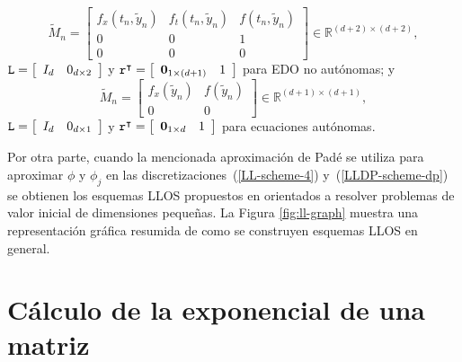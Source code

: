 \begin{equation*}
\widetilde{M}_{n}=\left[ 
\begin{array}{ccc}
f_{x}(t_{n},\widetilde{y}_{n}) &f%
_{t}(t_{n},\widetilde{y}_{n}) & f(t_{n},\widetilde{
		y}_{n}) \\ 
0 & 0 & 1 \\ 
0 & 0 & 0%
\end{array}%
\right] \in \mathbb{R}^{(d+2)\times (d+2)},
\end{equation*}%
$\lmatrix=\left[ 
\begin{array}{ll}
I_{d} & 0_{d\times 2}%
\end{array}%
\right] $ y $\rvector^{\intercal }=\left[ 
\begin{array}{ll}
\mathbf{0}_{1\times (d+1)} & 1%
\end{array}%
\right] $ para EDO no autónomas; y 
\begin{equation*}
\widetilde{M}_{n}=\left[ 
\begin{array}{cc}
f_{x}(\widetilde{y}_{n}) & f(\widetilde{y}_{n}) \\ 
0 & 0%
\end{array}%
\right] \in \mathbb{R}^{(d+1)\times (d+1)},
\end{equation*}%
$\lmatrix=\left[ 
\begin{array}{ll}
I_{d} & 0_{d\times 1}%
\end{array}%
\right] $ y $\rvector^{\intercal }=\left[ 
\begin{array}{ll}
\mathbf{0}_{1\times d} & 1%
\end{array}%
\right] $ para ecuaciones autónomas.

Por otra parte, cuando la mencionada aproximación de Padé se utiliza para aproximar $\phi$ y $\phi_j$ en las discretizaciones~(\ref{LL-scheme-4}) y~(\ref{LLDP-scheme-dp}) se obtienen los esquemas LLOS propuestos en \cite{Jimenez13,Jimenez14AMC} orientados a resolver problemas de valor inicial de dimensiones pequeñas. La Figura \ref{fig:ll-graph} muestra una representación gráfica resumida de como se construyen esquemas LLOS en general. 

\section{Cálculo de la exponencial de una matriz}

